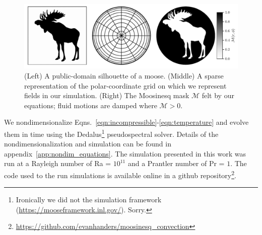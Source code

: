 \begin{figure}[t!]
\centering
\includegraphics[width=\textwidth]{paper_figure01.pdf}
    \caption{ 
        (Left) A public-domain silhouette of a moose.
        (Middle) A sparse representation of the polar-coordinate grid on which we represent fields in our simulation.
        (Right) The Moosinesq mask $\mathcal{M}$ felt by our equations; fluid motions are damped where $\mathcal{M} > 0$.
        \label{fig:methods}
    }
\end{figure}

We nondimensionalize Eqns.~\ref{eqn:incompressible}-\ref{eqn:temperature} and evolve them in time using the Dedalus\footnote{Ironically we did not the  simulation framework (\url{https://mooseframework.inl.gov/}). Sorry.} \citep{burns_etal_2020} pseudospectral solver.
Details of the nondimensionalization and simulation can be found in appendix~\ref{app:nondim_equations}.
The simulation presented in this work was run at a Rayleigh number of Ra = $10^{11}$ and a Prantler number of Pr = $1$.
The code used to the run simulations is available online in a github repository\footnote{\url{https://github.com/evanhanders/moosinesq_convection}}.
